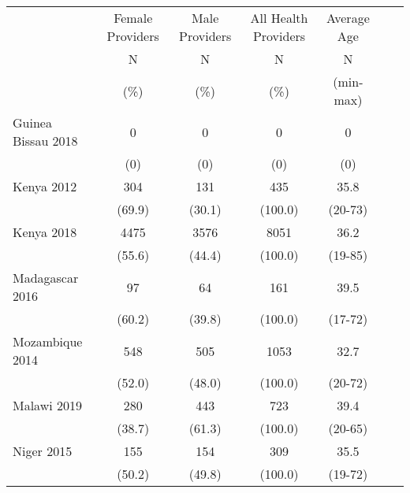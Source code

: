 \def\sym#1{\ifmmode^{#1}\else\(^{#1}\)\fi}
\begin{tabular}{l*{6}{c}}
\hline\hline
         &\multicolumn{1}{c}{Female Providers}&\multicolumn{1}{c}{Male Providers}&\multicolumn{1}{c}{All Health Providers}&\multicolumn{1}{c}{Average Age}&\\
               &       N&                     N&       N&                                       N\\
               &     (\%)&                 (\%)&    (\%)&                                     (min-max)\\
\hline
Guinea Bissau 2018&            {0}&                    {0}&                {0}&                        {0}\\
&                                              {(0)}&                  {(0)}&                  {(0)}&                          {(0)}\\
Kenya 2012&                            {304}&                {131}&           {435}&             {35.8}\\
&                                              {(69.9)}&      {(30.1)}&             {(100.0)}&           {(20-73)}\\
Kenya 2018&                    {4475}&                {3576}&           {8051}&             {36.2}\\
&                                              {(55.6)}&      {(44.4)}&             {(100.0)}&           {(19-85)}\\
Madagascar 2016&               {97}&                {64}&           {161}&             {39.5}\\
&                                              {(60.2)}&      {(39.8)}&             {(100.0)}&           {(17-72)}\\
Mozambique 2014&               {548}&                {505}&           {1053}&             {32.7}\\
&                                              {(52.0)}&      {(48.0)}&             {(100.0)}&           {(20-72)}\\
Malawi 2019&                   {280}&                {443}&           {723}&             {39.4}\\
&                                              {(38.7)}&      {(61.3)}&             {(100.0)}&           {(20-65)}\\
Niger 2015&                    {155}&                {154}&           {309}&             {35.5}\\
&                                              {(50.2)}&      {(49.8)}&             {(100.0)}&           {(19-72)}\\

\end{tabular}
